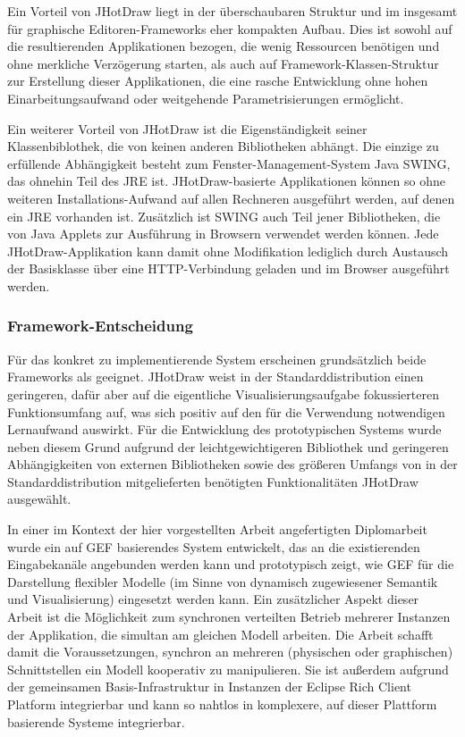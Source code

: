 Ein Vorteil von JHotDraw liegt in der überschaubaren Struktur und im insgesamt für graphische Editoren-Frameworks eher kompakten Aufbau. Dies ist sowohl auf die resultierenden Applikationen bezogen, die wenig Ressourcen benötigen und ohne merkliche Verzögerung starten, als auch auf Framework-Klassen-Struktur zur Erstellung dieser Applikationen, die eine rasche Entwicklung ohne hohen Einarbeitungsaufwand oder weitgehende Parametrisierungen ermöglicht.

Ein weiterer Vorteil von JHotDraw ist die Eigenständigkeit seiner Klassenbiblothek, die von keinen anderen Bibliotheken abhängt. Die einzige zu erfüllende Abhängigkeit besteht zum Fenster-Management-System Java SWING, das ohnehin Teil des \gls{JRE} ist. JHotDraw-basierte Applikationen können so ohne weiteren Installations-Aufwand auf allen Rechneren ausgeführt werden, auf denen ein \gls{JRE} vorhanden ist. Zusätzlich ist SWING auch Teil jener Bibliotheken, die von Java Applets zur Ausführung in Browsern verwendet werden können. Jede JHotDraw-Applikation kann damit ohne Modifikation lediglich durch Austausch der Basisklasse über eine \gls{HTTP}-Verbindung geladen und im Browser ausgeführt werden.


\subsubsection{Framework-Entscheidung} %
\label{ssub:output:framework_entscheidung}

Für das konkret zu implementierende System erscheinen grundsätzlich beide Frameworks als geeignet. JHotDraw weist in der Standarddistribution einen geringeren, dafür aber auf die eigentliche Visualisierungsaufgabe fokussierteren Funktionsumfang auf, was sich positiv auf den für die Verwendung notwendigen Lernaufwand auswirkt. Für die Entwicklung des prototypischen Systems wurde neben diesem Grund aufgrund der leichtgewichtigeren Bibliothek und geringeren Abhängigkeiten von externen Bibliotheken sowie des größeren Umfangs von in der Standarddistribution mitgelieferten benötigten Funktionalitäten JHotDraw ausgewählt.

In einer im Kontext der hier vorgestellten Arbeit angefertigten Diplomarbeit \citep{Feiner08} wurde ein auf \gls{GEF} basierendes System entwickelt, das an die existierenden Eingabekanäle angebunden werden kann und prototypisch zeigt, wie \gls{GEF} für die Darstellung flexibler Modelle (im Sinne von dynamisch zugewiesener Semantik und Visualisierung) eingesetzt werden kann. Ein zusätzlicher Aspekt dieser Arbeit ist die Möglichkeit zum synchronen verteilten Betrieb mehrerer Instanzen der Applikation, die simultan am gleichen Modell arbeiten. Die Arbeit schafft damit die Voraussetzungen, synchron an mehreren (physischen oder graphischen) Schnittstellen ein Modell kooperativ zu manipulieren. Sie ist außerdem aufgrund der gemeinsamen Basis-Infrastruktur in Instanzen der Eclipse Rich Client Platform \citep{McAffer05} integrierbar und kann so nahtlos in komplexere, auf dieser Plattform basierende Systeme integrierbar.

